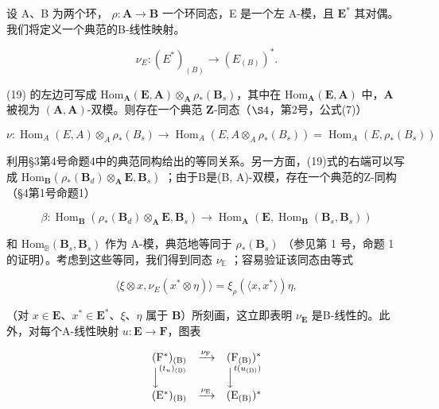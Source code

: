 设 A、B 为两个环， \(\rho: \mathbf{A} \to \mathbf{B}\) 一个环同态，E 是一个左 A-模，且 \(\mathbf{E}^*\) 其对偶。我们将定义一个典范的B-线性映射。

\[
\nu _ {E}: (E ^ {*}) _ {(B)} \rightarrow (E _ {(B)}) ^ {*}.\tag{19}
\]

(19) 的左边可写成 \(\mathrm{Hom}_{\mathbf{A}}(\mathbf{E},\mathbf{A})\otimes_{\mathbf{A}}\rho_{*}(\mathbf{B}_{s})\)，其中在 \(\mathrm{Hom}_{\mathbf{A}}(\mathbf{E},\mathbf{A})\) 中，\(\mathbf{A}\) 被视为 \((\mathbf{A},\mathbf{A})\)-双模。则存在一个典范 \(\mathbf{Z}\)-同态（\(\S 4\)，第2号，公式(7)）

\[
\nu: \operatorname{Hom} _ {A} (E, A) \otimes_ {A} \rho_ {*} (B _ {s}) \rightarrow \operatorname{Hom} _ {A} (E, A \otimes_ {A} \rho_ {*} (B _ {s})) = \operatorname{Hom} _ {A} (E, \rho_ {*} (B _ {s}))
\]

利用§3第4号命题4中的典范同构给出的等同关系。另一方面，(19)式的右端可以写成 \(\mathrm{Hom}_{\mathbf{B}}(\rho_{*}(\mathbf{B}_{d}) \otimes_{\mathbf{A}} \mathbf{E}, \mathbf{B}_{s})\) ；由于B是(B, A)-双模，存在一个典范的Z-同构（§4第1号命题1）

\[
\beta : \operatorname{Hom} _ {\mathbf {B}} (\rho_ {*} (\mathbf {B} _ {d}) \otimes_ {\mathbf {A}} \mathbf {E}, \mathbf {B} _ {s}) \rightarrow \operatorname{Hom} _ {\mathbf {A}} (\mathbf {E}, \operatorname{Hom} _ {\mathbf {B}} (\mathbf {B} _ {s}, \mathbf {B} _ {s}))
\]

和 \(\mathrm{Hom}_{\mathbb{B}}(\mathbf{B}_s,\mathbf{B}_s)\) 作为 A-模，典范地等同于 \(\rho_{*}(\mathbf{B}_{s})\) （参见第 1 号，命题 1 的证明）。考虑到这些等同，我们得到同态 \(\nu_{\mathbb{E}}\) ；容易验证该同态由等式

\[
\langle \xi \otimes x, \nu _ {E} (x ^ {*} \otimes \eta) \rangle = \xi_ {\rho} (\langle x, x ^ {*} \rangle) \eta ,\tag{20}
\]

（对 \(x \in \mathbf{E}\)、\(x^{*} \in \mathbf{E}^{*}\)、\(\xi\)、\(\eta\) 属于 \(\mathbf{B}\)）所刻画，这立即表明 \(\nu_{\mathbf{E}}\) 是B-线性的。此外，对每个A-线性映射 \(u: \mathbf{E} \to \mathbf{F}\)，图表

\[
\begin{array}{c c c} (\mathrm{F} ^ {*}) _ {(\mathrm{B})} & \xrightarrow {\nu_ {\mathrm{F}}} & (\mathrm{F} _ {(\mathrm{B})}) ^ {*} \\ \Big \downarrow^ {(t _ {u}) _ {(\mathrm{B})}} & & \Big \downarrow^ {t (u _ {(\mathrm{B})})} \\ (\mathrm{E} ^ {*}) _ {(\mathrm{B})} & \xrightarrow {\nu_ {\mathrm{E}}} & (\mathrm{E} _ {(\mathrm{B})}) ^ {*} \end{array}
\]

